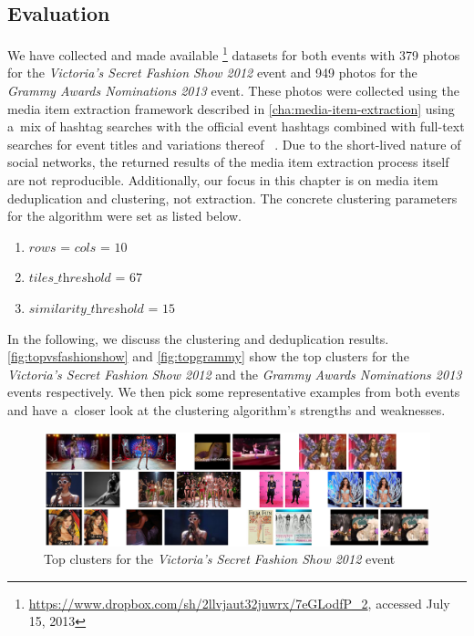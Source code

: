 \subsection{Evaluation}\label{sec:evaluation-chpater6}

We have collected and made available%
\footnote{\url{https://www.dropbox.com/sh/2llvjaut32juwrx/7eGLodfP_2},
accessed July 15, 2013}
datasets for both events with
379 photos for the \emph{Victoria's Secret Fashion Show 2012} event 
and 949 photos for the \emph{Grammy Awards Nominations 2013} event.
These photos were collected using the media item extraction framework
described in \autoref{cha:media-item-extraction}
using a~mix of hashtag searches with the official event hashtags combined
with full-text searches for event titles and variations thereof~%
\cite{becker2010eventidentification,becker2012plannedevents}.
Due to the short-lived nature of social networks,
the returned results of the media item extraction process itself
are not reproducible.
Additionally, our focus in this chapter
is on media item deduplication and clustering, not extraction.
The concrete clustering parameters for the algorithm were set as listed below.

\begin{enumerate}
  \item $\textit{rows}$ = $\textit{cols}$ = $10$
  \item $\textit{tiles\_threshold}$ = $67$
  \item $\textit{similarity\_threshold}$ = $15$
\end{enumerate}

In the following, we discuss the clustering and deduplication results.
\autoref{fig:topvsfashionshow} and \autoref{fig:topgrammy} show the top clusters
for the \emph{Victoria's Secret Fashion Show 2012} and the 
\emph{Grammy Awards Nominations 2013} events respectively.
We then pick some representative examples from both events
and have a~closer look at the clustering algorithm's strengths and weaknesses.

\begin{figure}[!h]
  \centering
  \includegraphics[width=1.0\linewidth]{./vsfashionshow_clusters.png}
  \caption{Top clusters for the \emph{Victoria's Secret Fashion Show 2012} event}
  \label{fig:topvsfashionshow}
\end{figure}

